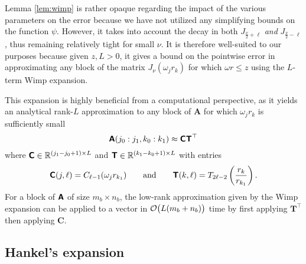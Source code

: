 Lemma \ref{lem:wimp} is rather opaque regarding the impact of the various
parameters on the error because we have not utilized any simplifying bounds on
the function $\psi$. However, it takes into account the decay in both
$J_{\frac{\nu}{2}+\ell}$ \textit{and} $J_{\frac{\nu}{2}-\ell}$, thus remaining
relatively tight for small $\nu$. It is therefore well-suited to our purposes
because given $z, L > 0$, it gives a bound on the pointwise error in
approximating any block of the matrix $J_\nu(\omega_j r_k)$ for which $\omega r
\leq z$ using the $L$-term Wimp expansion. 

This expansion is highly beneficial from a computational perspective, as it
yields an analytical rank-$L$ approximation to any block of $\bm{A}$ for which
$\omega_j r_k$ is sufficiently small
\begin{equation}
  \bm{\mathsf{A}}(j_0:j_1, k_0:k_1)
  \approx \bm{\mathsf{C}}\bm{\mathsf{T}}^\top
\end{equation}
where $\bm{\mathsf{C}} \in \mathbb{R}^{(j_1-j_0+1) \times L}$ and $\bm{\mathsf{T}} \in \mathbb{R}^{(k_1-k_0+1)
  \times L}$ with entries
\begin{equation}
  \bm{\mathsf{C}}(j,\ell) = C_{\ell-1}(\omega_j r_{k_1}) \qquad  \text{and} \qquad 
  \bm{\mathsf{T}}(k,\ell) = T_{2\ell-2}\left(\frac{r_k}{r_{k_1}}\right).
\end{equation}
For a block of
$\bm{\mathsf{A}}$ of size $m_b \times n_b$, the low-rank approximation given by the Wimp
expansion can be applied to a vector in $\mathcal{O}\big(L(m_b + n_b)\big)$ time by
first applying $\bm{T}^\top$ then applying $\bm{C}$.

\subsection{Hankel's expansion}
\label{sec:asymptotic}

